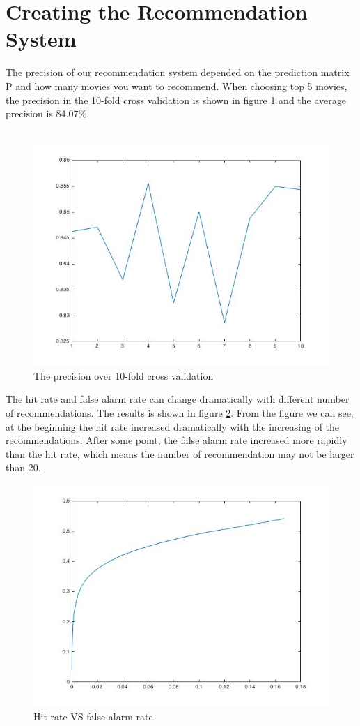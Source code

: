 \documentclass{article}
\begin{document}
\section{Creating the Recommendation System}
The precision of our recommendation system depended on the prediction matrix P and how many movies you want to recommend. When choosing top 5 movies, the precision in the 10-fold cross validation is shown in figure \ref{fig:p5} and the average precision is 84.07\%.\\
\\
\begin{figure}[htbp]
\centering
\includegraphics[width=.6\textwidth]{precision_5.jpg}
\caption{The precision over 10-fold cross validation}
\label{fig:p5}
\end{figure}
The hit rate and false alarm rate can change dramatically with different number of recommendations. The results is shown in figure \ref{fig:hit}. From the figure we can see, at the beginning the hit rate increased dramatically with the increasing of the recommendations. After some point, the false alarm rate increased more rapidly than the hit rate, which means the number of recommendation may not be larger than 20.
\begin{figure}[htbp]
\centering
\includegraphics[width=.6\textwidth]{hit_false_20.jpg}
\caption{Hit rate VS false alarm rate}
\label{fig:hit}
\end{figure}
\end{document}
